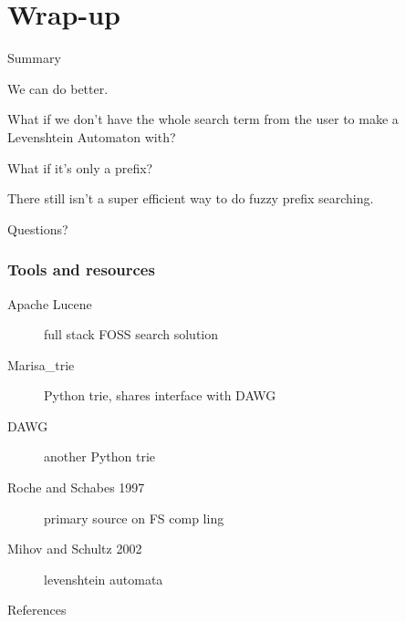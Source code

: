 \documentclass[10pt]{beamer}
\begin{document}
\begin{frame}[fragile]
\begin{figure}
\begin{subfigure}
  \end{subfigure}
  \end{figure}
  
\end{frame}







\section{Wrap-up}

\begin{frame}{Summary}

  We can do better. 

  \pause

  What if we don't have the whole search term from the user to make a Levenshtein Automaton with? 

  \pause

  What if it's only a prefix?

  \pause

  There still isn't a super efficient way to do fuzzy prefix searching.
\end{frame}

\begin{frame}[standout]
  Questions?
\end{frame}

\appendix

\begin{frame}[t]
  \frametitle{Tools and resources}
  
  \begin{description}
    \item[Apache Lucene] full stack FOSS search solution

    \item[Marisa\_trie] Python trie, shares interface with DAWG

    \item[DAWG] another Python trie

    \item[Roche and Schabes 1997] primary source on FS comp ling

    \item[Mihov and Schultz 2002] levenshtein automata
  \end{description}
  
\end{frame}




\begin{frame}[allowframebreaks]{References}

  \nocite{*}
  
  

\end{frame}
\end{document}
